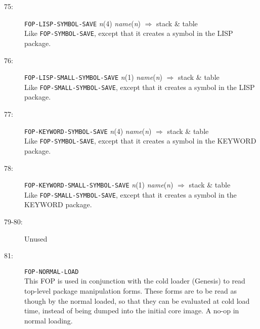 \begin{description}
\item[75:] \hspace{2em} {\tt FOP-LISP-SYMBOL-SAVE} \hspace{2em} {\it n}(4) \hspace{2em} {\it name}({\it n})
\hspace{2em} $\Rightarrow$ \hspace{2em} stack \& table\\
Like {\tt FOP-SYMBOL-SAVE}, except that it creates a symbol in the LISP
package.

\item[76:] \hspace{2em} {\tt FOP-LISP-SMALL-SYMBOL-SAVE} \hspace{2em} {\it n}(1)
\hspace{2em} {\it name}({\it n}) \hspace{2em} $\Rightarrow$ \hspace{2em} stack
\& table\\
Like {\tt FOP-SMALL-SYMBOL-SAVE}, except that it creates a symbol in the LISP
package.

\item[77:] \hspace{2em} {\tt FOP-KEYWORD-SYMBOL-SAVE} \hspace{2em} {\it n}(4) \hspace{2em} {\it name}({\it n})
\hspace{2em} $\Rightarrow$ \hspace{2em} stack \& table\\
Like {\tt FOP-SYMBOL-SAVE}, except that it creates a symbol in the
KEYWORD package.

\item[78:] \hspace{2em} {\tt FOP-KEYWORD-SMALL-SYMBOL-SAVE} \hspace{2em} {\it n}(1)
\hspace{2em} {\it name}({\it n}) \hspace{2em} $\Rightarrow$ \hspace{2em} stack
\& table\\
Like {\tt FOP-SMALL-SYMBOL-SAVE}, except that it creates a symbol in the
KEYWORD package.

\item[79-80:] Unused

\item[81:] \hspace{2em} {\tt FOP-NORMAL-LOAD}\\
This FOP is used in conjunction with the cold loader (Genesis) to read
top-level package manipulation forms.  These forms are to be read as though by
the normal loaded, so that they can be evaluated at cold load time, instead of
being dumped into the initial core image.  A no-op in normal loading.


\end{description}
